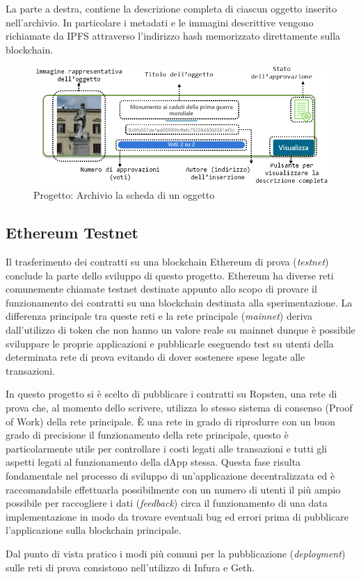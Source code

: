 La parte a destra, contiene la descrizione completa di ciascun oggetto inserito nell'archivio. In particolare i metadati e le immagini descrittive vengono richiamate da IPFS attraverso l'indirizzo hash memorizzato direttamente sulla blockchain.

\begin{figure}[H]
\centering
\includegraphics[width=1\textwidth]{immagini/artworkFocusCommented.png}
\caption{Progetto: Archivio la scheda di un oggetto}
\label{fig:artworkFocus}
\end{figure}

\subsection{Ethereum Testnet}

Il trasferimento dei contratti su una blockchain Ethereum di prova (\emph{testnet}) conclude la parte dello sviluppo di questo progetto. Ethereum ha diverse reti comunemente chiamate testnet destinate appunto allo scopo di provare il funzionamento dei contratti su una blockchain destinata alla sperimentazione. La differenza principale tra queste reti e la rete principale (\emph{mainnet}) deriva dall’utilizzo di token che non hanno un valore reale su mainnet dunque è possibile sviluppare le proprie applicazioni e pubblicarle eseguendo test su utenti della determinata rete di prova evitando di dover sostenere spese legate alle transazioni.

In questo progetto si è scelto di pubblicare i contratti su Ropsten, una rete di prova che, al momento dello scrivere, utilizza lo stesso sistema di consenso (Proof of Work) della rete principale. È una rete in grado di riprodurre con un buon grado di precisione il funzionamento della rete principale, questo è particolarmente utile per controllare i costi legati alle transazioni e tutti gli aspetti legati al funzionamento della dApp stessa. Questa fase risulta fondamentale nel processo di sviluppo di un’applicazione decentralizzata ed è raccomandabile effettuarla possibilmente con un numero di utenti il più ampio possibile per raccogliere i dati (\emph{feedback}) circa il funzionamento di una data implementazione in modo da trovare eventuali bug ed errori prima di pubblicare l'applicazione sulla blockchain principale.

Dal punto di vista pratico i modi più comuni per la pubblicazione (\emph{deployment}) sulle reti di prova consistono nell’utilizzo di Infura e Geth.


